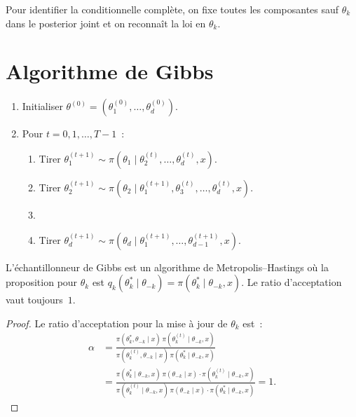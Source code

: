 \begin{remarque}
Pour identifier la conditionnelle compl\`ete, on fixe toutes les
composantes sauf $\theta_k$ dans le posterior joint et on reconna\^it
la loi en $\theta_k$.
\end{remarque}

\section{Algorithme de Gibbs}

\begin{algorithme}[title=\textbf{\'Echantillonneur de Gibbs}]
\begin{enumerate}
  \item Initialiser $\theta^{(0)} = (\theta_1^{(0)}, \ldots, \theta_d^{(0)})$.
  \item Pour $t = 0, 1, \ldots, T-1$~:
  \begin{enumerate}
    \item Tirer $\theta_1^{(t+1)} \sim \pi(\theta_1 \mid \theta_2^{(t)}, \ldots, \theta_d^{(t)}, x)$.
    \item Tirer $\theta_2^{(t+1)} \sim \pi(\theta_2 \mid \theta_1^{(t+1)}, \theta_3^{(t)}, \ldots, \theta_d^{(t)}, x)$.
    \item[$\vdots$]
    \item Tirer $\theta_d^{(t+1)} \sim \pi(\theta_d \mid \theta_1^{(t+1)}, \ldots, \theta_{d-1}^{(t+1)}, x)$.
  \end{enumerate}
\end{enumerate}
\end{algorithme}

\begin{theoreme}
L'\'echantillonneur de Gibbs est un algorithme de Metropolis--Hastings
o\`u la proposition pour $\theta_k$ est
$q_k(\theta_k^* \mid \theta_{-k}) = \pi(\theta_k^* \mid \theta_{-k}, x)$.
Le ratio d'acceptation vaut toujours~$1$.
\end{theoreme}

\begin{proof}
Le ratio d'acceptation pour la mise \`a jour de $\theta_k$ est~:
\begin{align*}
  \alpha &= \frac{\pi(\theta_k^*, \theta_{-k} \mid x)\,\pi(\theta_k^{(t)} \mid \theta_{-k}, x)}
                 {\pi(\theta_k^{(t)}, \theta_{-k} \mid x)\,\pi(\theta_k^* \mid \theta_{-k}, x)} \\
  &= \frac{\pi(\theta_k^* \mid \theta_{-k}, x)\,\pi(\theta_{-k} \mid x)
            \cdot \pi(\theta_k^{(t)} \mid \theta_{-k}, x)}
          {\pi(\theta_k^{(t)} \mid \theta_{-k}, x)\,\pi(\theta_{-k} \mid x)
            \cdot \pi(\theta_k^* \mid \theta_{-k}, x)}
  = 1.
\end{align*}
\end{proof}

